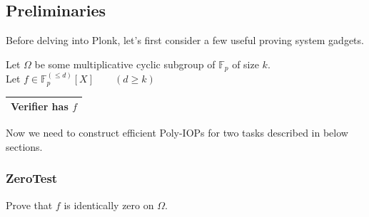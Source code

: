 \documentclass[../lecture-notes.tex]{subfiles}
\begin{document}
\subsection{Preliminaries}

Before delving into Plonk, let's first consider a few useful proving system gadgets.

Let $\Omega$ be some multiplicative cyclic subgroup of $\mathbb{F}_p$ of size $k$. \\
Let $f \in \mathbb{F}_p^{(\leq d)}[X] \qquad (d \geq k)$ \hfill \begin{tabular}{|c|}\hline Verifier has $f$ \\ \hline \end{tabular} 

Now we need to construct efficient Poly-IOPs for two tasks described in below sections.

\subsubsection{ZeroTest}

Prove that $f$ is identically zero on $\Omega$.
\end{document}
